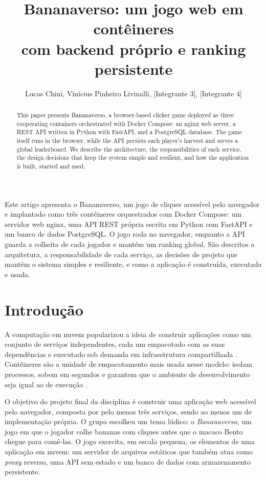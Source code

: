 \documentclass[12pt]{article}
\title{Bananaverso: um jogo web em contêineres\\com backend próprio e ranking persistente}
\author{Lucas Chini\inst{1}, Vinícius Pinheiro Livinalli\inst{1},
        [Integrante 3]\inst{1}, [Integrante 4]\inst{1}}
\begin{document}
\maketitle

\begin{abstract}
This paper presents Bananaverso, a browser-based clicker game deployed as
three cooperating containers orchestrated with Docker Compose: an nginx
web server, a REST API written in Python with FastAPI, and a PostgreSQL
database. The game itself runs in the browser, while the API persists
each player's harvest and serves a global leaderboard. We describe the
architecture, the responsibilities of each service, the design decisions
that keep the system simple and resilient, and how the application is
built, started and used.
\end{abstract}

\begin{resumo}
Este artigo apresenta o Bananaverso, um jogo de cliques acessível pelo
navegador e implantado como três contêineres orquestrados com Docker
Compose: um servidor web nginx, uma API REST própria escrita em Python com
FastAPI e um banco de dados PostgreSQL. O jogo roda no navegador, enquanto
a API guarda a colheita de cada jogador e mantém um ranking global. São
descritos a arquitetura, a responsabilidade de cada serviço, as decisões de
projeto que mantêm o sistema simples e resiliente, e como a aplicação é
construída, executada e usada.
\end{resumo}

\section{Introdução}

A computação em nuvem popularizou a ideia de construir aplicações como um
conjunto de serviços independentes, cada um empacotado com as suas
dependências e executado sob demanda em infraestrutura compartilhada
\cite{nist}. Contêineres são a unidade de empacotamento mais usada nesse
modelo: isolam processos, sobem em segundos e garantem que o ambiente de
desenvolvimento seja igual ao de execução \cite{merkel,bernstein}.

O objetivo do projeto final da disciplina é construir uma aplicação web
acessível pelo navegador, composta por pelo menos três serviços, sendo ao
menos um de implementação própria. O grupo escolheu um tema lúdico: o
\emph{Bananaverso}, um jogo em que o jogador colhe bananas com cliques
antes que o macaco Bento chegue para comê-las. O jogo exercita, em escala
pequena, os elementos de uma aplicação em nuvem: um servidor de arquivos
estáticos que também atua como \emph{proxy} reverso, uma API sem estado e
um banco de dados com armazenamento persistente.
\end{document}
